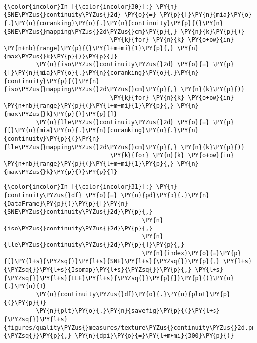     \begin{center}
    \end{center}
    { \hspace*{\fill} \\}

    \begin{Verbatim}[commandchars=\\\{\}]
{\color{incolor}In [{\color{incolor}30}]:} \PY{n}{SNE\PYZus{}continuity\PYZus{}2d} \PY{o}{=} \PY{p}{[}\PY{n}{mia}\PY{o}{.}\PY{n}{coranking}\PY{o}{.}\PY{n}{continuity}\PY{p}{(}\PY{n}{SNE\PYZus{}mapping\PYZus{}2d\PYZus{}cm}\PY{p}{,} \PY{n}{k}\PY{p}{)}
                              \PY{k}{for} \PY{n}{k} \PY{o+ow}{in} \PY{n+nb}{range}\PY{p}{(}\PY{l+m+mi}{1}\PY{p}{,} \PY{n}{max\PYZus{}k}\PY{p}{)}\PY{p}{]}
         \PY{n}{iso\PYZus{}continuity\PYZus{}2d} \PY{o}{=} \PY{p}{[}\PY{n}{mia}\PY{o}{.}\PY{n}{coranking}\PY{o}{.}\PY{n}{continuity}\PY{p}{(}\PY{n}{iso\PYZus{}mapping\PYZus{}2d\PYZus{}cm}\PY{p}{,} \PY{n}{k}\PY{p}{)}
                              \PY{k}{for} \PY{n}{k} \PY{o+ow}{in} \PY{n+nb}{range}\PY{p}{(}\PY{l+m+mi}{1}\PY{p}{,} \PY{n}{max\PYZus{}k}\PY{p}{)}\PY{p}{]}
         \PY{n}{lle\PYZus{}continuity\PYZus{}2d} \PY{o}{=} \PY{p}{[}\PY{n}{mia}\PY{o}{.}\PY{n}{coranking}\PY{o}{.}\PY{n}{continuity}\PY{p}{(}\PY{n}{lle\PYZus{}mapping\PYZus{}2d\PYZus{}cm}\PY{p}{,} \PY{n}{k}\PY{p}{)}
                              \PY{k}{for} \PY{n}{k} \PY{o+ow}{in} \PY{n+nb}{range}\PY{p}{(}\PY{l+m+mi}{1}\PY{p}{,} \PY{n}{max\PYZus{}k}\PY{p}{)}\PY{p}{]}
\end{Verbatim}

    \begin{Verbatim}[commandchars=\\\{\}]
{\color{incolor}In [{\color{incolor}31}]:} \PY{n}{continuity\PYZus{}df} \PY{o}{=} \PY{n}{pd}\PY{o}{.}\PY{n}{DataFrame}\PY{p}{(}\PY{p}{[}\PY{n}{SNE\PYZus{}continuity\PYZus{}2d}\PY{p}{,}
                                       \PY{n}{iso\PYZus{}continuity\PYZus{}2d}\PY{p}{,}
                                       \PY{n}{lle\PYZus{}continuity\PYZus{}2d}\PY{p}{]}\PY{p}{,}
                                       \PY{n}{index}\PY{o}{=}\PY{p}{[}\PY{l+s}{\PYZsq{}}\PY{l+s}{SNE}\PY{l+s}{\PYZsq{}}\PY{p}{,} \PY{l+s}{\PYZsq{}}\PY{l+s}{Isomap}\PY{l+s}{\PYZsq{}}\PY{p}{,} \PY{l+s}{\PYZsq{}}\PY{l+s}{LLE}\PY{l+s}{\PYZsq{}}\PY{p}{]}\PY{p}{)}\PY{o}{.}\PY{n}{T}
         \PY{n}{continuity\PYZus{}df}\PY{o}{.}\PY{n}{plot}\PY{p}{(}\PY{p}{)}
         \PY{n}{plt}\PY{o}{.}\PY{n}{savefig}\PY{p}{(}\PY{l+s}{\PYZsq{}}\PY{l+s}{figures/quality\PYZus{}measures/texture\PYZus{}continuity\PYZus{}2d.png}\PY{l+s}{\PYZsq{}}\PY{p}{,} \PY{n}{dpi}\PY{o}{=}\PY{l+m+mi}{300}\PY{p}{)}
\end{Verbatim}

